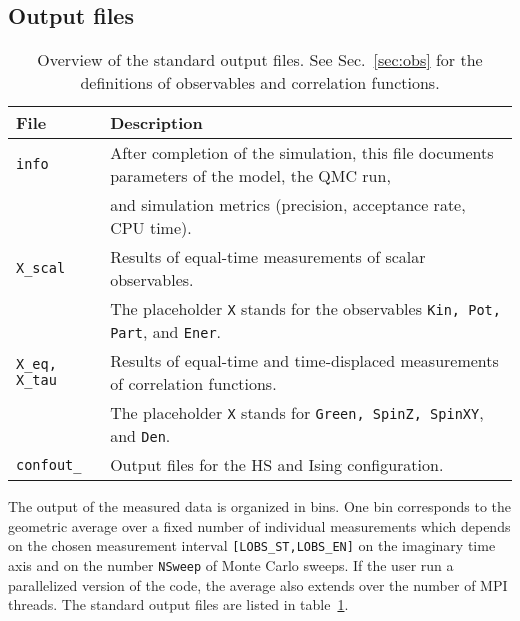 %

\subsection{Output files} \label{sec:output}
%
\begin{table}[h]
   \begin{tabular}{l l}
   File & Description \\\hline
   \texttt{info} & After completion of the simulation, this file documents parameters of the  model, the QMC run, \\
   & and simulation metrics (precision, acceptance rate, CPU time).\\
   \texttt{X\_scal} & Results of equal-time measurements of scalar observables. \\
   & The placeholder \texttt{X} stands for the observables \texttt{Kin, Pot, Part}, and \texttt{Ener}. \\
   \texttt{X\_eq, X\_tau} & Results of equal-time and time-displaced measurements of correlation functions. \\
   & The placeholder \texttt{X} stands for \texttt{Green, SpinZ, SpinXY}, and \texttt{Den}. \\   
   \texttt{confout\_<thread number>} & Output files for the HS and Ising configuration. 
   \end{tabular}
   \caption{Overview of the standard output files. 
  See Sec.~\ref{sec:obs} for the definitions of observables and correlation functions. \label{table:output}}
\end{table}
%
The output of the measured data is organized in bins. One bin corresponds to the geometric average over a fixed number of individual measurements which depends 
on the chosen measurement interval \texttt{[LOBS\_ST,LOBS\_EN]} on the imaginary time axis and on the number \texttt{NSweep} of Monte Carlo sweeps. If the user run a parallelized version of the code, the average also extends 
over the number of MPI threads. 
The standard output files are listed in table~\ref{table:output}. 

